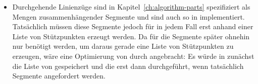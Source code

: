 \documentclass[../main/thesis.tex]{subfiles}
\begin{document}
\begin{itemize}

\item
Durchgehende Linienzüge sind in Kapitel~\ref{ch:algorithm-parts} spezifiziert als Mengen zusammenhängender Segmente und sind auch so in  implementiert.
Tatsächlich müssen diese Segmente jedoch für  in jedem Fall erst anhand einer Liste von Stützpunkten erzeugt werden.
Da für  die Segmente später ohnehin nur benötigt werden, um daraus gerade eine Liste von Stützpunkten zu erzeugen, wäre eine Optimierung von  durch  angebracht:
Es würde in  zunächst die Liste von  gespeichert und die  erst dann durchgeführt, wenn tatsächlich Segmente angefordert werden.

\end{itemize}



\onlyinsubfile{\listoffigures}
\onlyinsubfile{}
\end{document}
